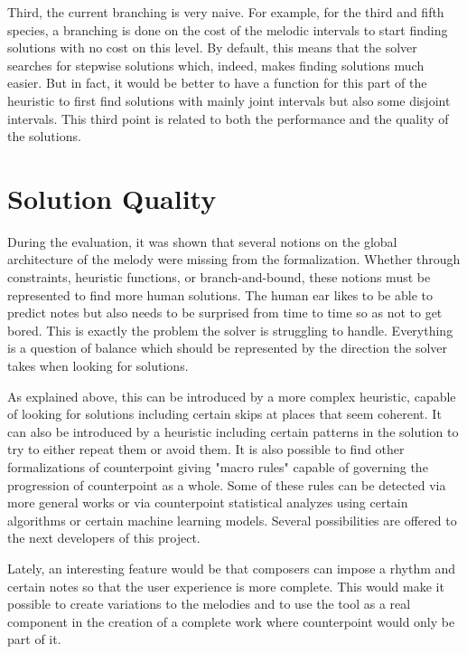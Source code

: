 Third, the current branching is very naive. For example, for the third and fifth species, a branching is done on the cost of the melodic intervals to start finding solutions with no cost on this level. By default, this means that the solver searches for stepwise solutions which, indeed, makes finding solutions much easier. But in fact, it would be better to have a function for this part of the heuristic to first find solutions with mainly joint intervals but also some disjoint intervals. This third point is related to both the performance and the quality of the solutions.

\section{Solution Quality}
During the evaluation, it was shown that several notions on the global architecture of the melody were missing from the formalization. Whether through constraints, heuristic functions, or branch-and-bound, these notions must be represented to find more human solutions. The human ear likes to be able to predict notes but also needs to be surprised from time to time so as not to get bored. This is exactly the problem the solver is struggling to handle. Everything is a question of balance which should be represented by the direction the solver takes when looking for solutions.

As explained above, this can be introduced by a more complex heuristic, capable of looking for solutions including certain skips at places that seem coherent. It can also be introduced by a heuristic including certain patterns in the solution to try to either repeat them or avoid them. It is also possible to find other formalizations of counterpoint giving "macro rules" capable of governing the progression of counterpoint as a whole. Some of these rules can be detected via more general works or via counterpoint statistical analyzes using certain algorithms or certain machine learning models. Several possibilities are offered to the next developers of this project.

Lately, an interesting feature would be that composers can impose a rhythm and certain notes so that the user experience is more complete. This would make it possible to create variations to the melodies and to use the tool as a real component in the creation of a complete work where counterpoint would only be part of it.
